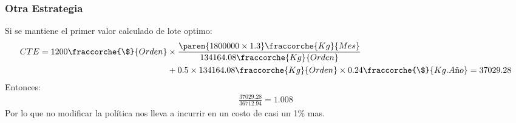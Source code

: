 \begin{homeworkProblem}
\subsubsection{Otra Estrategia}
Si se mantiene el primer valor calculado de lote optimo:
\begin{align*}
    CTE = 1200\fraccorche{\$}{Orden}&\times \frac{\paren{1800000\times 1.3}\fraccorche{Kg}{Mes}}{134164.08\fraccorche{Kg}{Orden}} \\ &+ 0.5\times 134164.08\fraccorche{Kg}{Orden}\times 0.24\fraccorche{\$}{Kg.A\text{ñ}o}=37029.28
\end{align*}
Entonces:
\begin{align*}
    \frac{37029.28}{36712.94}=1.008
\end{align*}
Por lo que no modificar la política nos lleva a incurrir en un costo de casi un 1\% mas.
\end{homeworkProblem}